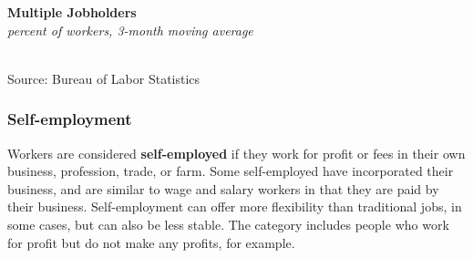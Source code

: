 \documentclass{report}
\makeatletter
\newcommand{\tbllink}[1]{\href{https://raw.githubusercontent.com/bdecon/US-chartbook/master/chartbook/data/#1}{\faTable}}
\newcommand*\short[1]{\expandafter\@gobbletwo\number\numexpr#1\relax}
\newcommand{\shdateaxisticks}{
		date coordinates in=x, axis line style={draw=none},
		xmax={2022-03-15},
		max space between ticks=40,	    
		xtick={{1990-01-01}, {1995-01-01}, {2000-01-01}, 
			{2005-01-01}, {2010-01-01}, {2015-01-01}, {2020-01-01}},
		minor xtick={},
		enlarge y limits={0.06}, enlarge x limits={0.01},
		}
\newcommand{\thickline}[4]{\addplot[ultra thick, no markers, color=#1] 
		table [x=#2, y=#3, col sep=comma] {#4};	}
\newcommand{\rebars}{
		\fill[color=black!10] (axis cs:{2007-12-01},\pgfkeysvalueof{/pgfplots/ymin}) rectangle 
			(axis cs:{2009-07-01}, \pgfkeysvalueof{/pgfplots/ymax});
		\fill[color=black!10] (axis cs:{2001-03-01},\pgfkeysvalueof{/pgfplots/ymin}) rectangle 
			(axis cs:{2001-11-01}, \pgfkeysvalueof{/pgfplots/ymax});
		\fill[color=black!10] (axis cs:{2020-02-01},\pgfkeysvalueof{/pgfplots/ymin}) rectangle 
			(axis cs:{2020-05-01}, \pgfkeysvalueof{/pgfplots/ymax});}
\makeatother
\begin{document}
{{\begin{minipage}{0.76\textwidth}
\begin{minipage}{0.56\textwidth}
\normalsize \textbf{Multiple Jobholders}\\
\footnotesize{\textit{percent of workers, 3-month moving average}}\\
\hspace*{-2mm} \\
\footnotesize{Source: Bureau of Labor Statistics} \hfill \tbllink{mjh.csv} 
\end{minipage} \hfill
\begin{minipage}{0.38\textwidth}
\small 
\end{minipage}
\end{minipage}
\newpage
\begin{minipage}{0.76\textwidth}
\subsubsection*{Self-employment}
\small Workers are considered \textbf{self-employed} if they work for profit or fees in their own business, profession, trade, or farm. Some self-employed have incorporated their business, and are similar to wage and salary workers in that they are paid by their business. Self-employment can offer more flexibility than traditional jobs, in some cases, but can also be less stable. The category includes people who work for profit but do not make any profits, for example. 


\vspace{0.5mm}


\end{minipage}}}
\end{document}

